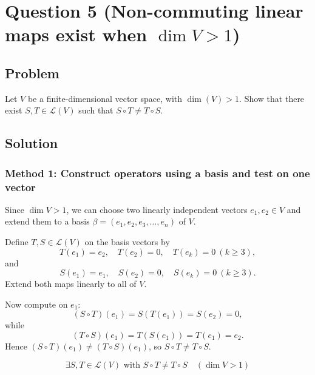 \documentclass[12pt]{article}
\newcommand{\cL}{\mathcal{L}}
\begin{document}
\newpage
\section{Question 5 (Non-commuting linear maps exist when $\dim V>1$)}
\subsection{Problem}
Let $V$ be a finite-dimensional vector space, with $\dim(V)>1$.
Show that there exist $S,T\in \cL(V)$ such that $S\circ T\neq T\circ S$.

\subsection{Solution}

\subsubsection{Method 1: Construct operators using a basis and test on one vector}
Since $\dim V>1$, we can choose two linearly independent vectors $e_1,e_2\in V$ and extend them to a basis
$\beta=(e_1,e_2,e_3,\dots,e_n)$ of $V$.

Define $T,S\in\cL(V)$ on the basis vectors by
\[
T(e_1)=e_2,\quad T(e_2)=0,\quad T(e_k)=0\ (k\ge 3),
\]
and
\[
S(e_1)=e_1,\quad S(e_2)=0,\quad S(e_k)=0\ (k\ge 3).
\]
Extend both maps linearly to all of $V$.

Now compute on $e_1$:
\[
(S\circ T)(e_1)=S(T(e_1))=S(e_2)=0,
\]
while
\[
(T\circ S)(e_1)=T(S(e_1))=T(e_1)=e_2.
\]
Hence $(S\circ T)(e_1)\neq (T\circ S)(e_1)$, so $S\circ T\neq T\circ S$.

\[
\boxed{\,\exists S,T\in\cL(V)\text{ with }S\circ T\neq T\circ S\quad (\dim V>1)\,}
\]
\end{document}
